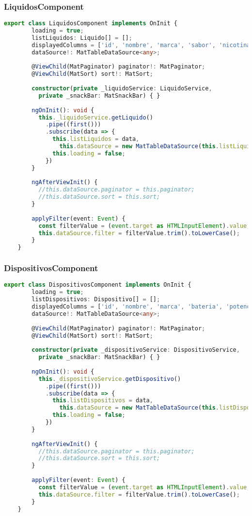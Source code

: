 \documentclass[a4paper]{article} %
\begin{document}
\subsubsection{LiquidosComponent}
\begin{lstlisting}[language=Typescript]
	export class LiquidosComponent implements OnInit {
		loading = true;
		listLiquidos: Liquido[] = [];
		displayedColumns = ['id', 'nombre', 'marca', 'sabor', 'nicotina', 'coste'];
		dataSource!: MatTableDataSource<any>;
		
		@ViewChild(MatPaginator) paginator!: MatPaginator;
		@ViewChild(MatSort) sort!: MatSort;
		
		constructor(private _liquidoService: LiquidoService,
		  private _snackBar: MatSnackBar) { }
		
		ngOnInit(): void {
		  this._liquidoService.getLiquido()
			.pipe((first()))
			.subscribe(data => {
			  this.listLiquidos = data,
				this.dataSource = new MatTableDataSource(this.listLiquidos);
			  this.loading = false;
			})
		}
		
		ngAfterViewInit() {
		  //this.dataSource.paginator = this.paginator;
		  //this.dataSource.sort = this.sort;
		}
		
		applyFilter(event: Event) {
		  const filterValue = (event.target as HTMLInputElement).value;
		  this.dataSource.filter = filterValue.trim().toLowerCase();
		}
	}
\end{lstlisting}
\subsubsection{DispositivosComponent}
\begin{lstlisting}[language=Typescript]
	export class DispositivosComponent implements OnInit {
		loading = true;
		listDispositivos: Dispositivo[] = [];
		displayedColumns = ['id', 'nombre', 'marca', 'bateria', 'potencia', 'coste'];
		dataSource!: MatTableDataSource<any>;
		
		@ViewChild(MatPaginator) paginator!: MatPaginator;
		@ViewChild(MatSort) sort!: MatSort;
		
		constructor(private _dispositivoService: DispositivoService,
		  private _snackBar: MatSnackBar) { }
		
		ngOnInit(): void {
		  this._dispositivoService.getDispositivo()
			.pipe((first()))
			.subscribe(data => {
			  this.listDispositivos = data,
				this.dataSource = new MatTableDataSource(this.listDispositivos);
			  this.loading = false;
			})
		}
		
		ngAfterViewInit() {
		  //this.dataSource.paginator = this.paginator;
		  //this.dataSource.sort = this.sort;
		}
		
		applyFilter(event: Event) {
		  const filterValue = (event.target as HTMLInputElement).value;
		  this.dataSource.filter = filterValue.trim().toLowerCase();
		}
	}
\end{lstlisting}\clearpage
\end{document}
